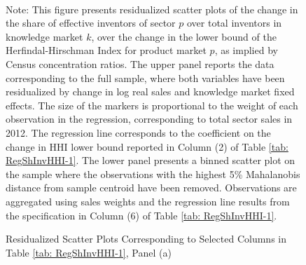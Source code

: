 \begin{figure}
\caption{Residualized Scatter Plots Corresponding to Selected Columns in Table
\ref{tab: RegShInvHHI-1}, Panel (a)\label{fig: scattersDksh-1}}


\\

\raggedright{}{\small{}Note: This figure presents residualized scatter
plots of the change in the share of effective inventors of sector
$p$ over total inventors in knowledge market $k$, over the change
in the lower bound of the Herfindal-Hirschman Index for product market
$p$, as implied by Census concentration ratios. The upper panel reports
the data corresponding to the full sample, where both variables have
been residualized by change in log real sales and knowledge market
fixed effects. The size of the markers is proportional to the weight
of each observation in the regression, corresponding to total sector
sales in 2012. The regression line corresponds to the coefficient
on the change in HHI lower bound reported in Column (2) of Table }\ref{tab: RegShInvHHI-1}{\small{}.
The lower panel presents a binned scatter plot on the sample where
the observations with the highest 5\% Mahalanobis distance from sample
centroid have been removed. Observations are aggregated using sales
weights and the regression line results from the specification in
Column (6) of Table }\ref{tab: RegShInvHHI-1}{\small{}.}{\small\par}
\end{figure}
\FloatBarrier


